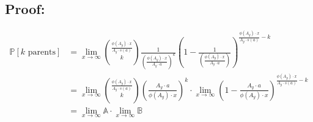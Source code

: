 \documentclass{article}
\theoremstyle{definition}
\begin{document}
\subsection*{Proof:}
\label{appendix:simple}
\begin{align*}
    \mathbb{P}[k \text{ parents}] & =  \lim_{x \to \infty}{\frac{\phi(A_y) \cdot x}{A_y \cdot s(a)} \choose k } \frac{1}{\left(\frac{\phi(A_y) \cdot x}{ A_y \cdot a}\right)^k} \left(1- \frac{1}{\left(\frac{\phi(A_y) \cdot x}{ A_y \cdot a}\right)}\right)^{\frac{\phi(A_y) \cdot x}{A_y \cdot s(a)  } -k} \\
                                  & =  \lim_{x \to \infty}{\frac{\phi(A_y) \cdot x}{A_y \cdot s(a)} \choose k } \left(\frac{A_y \cdot a}{\phi(A_y) \cdot x}\right)^k \cdot \lim_{x \to \infty}\left(1- \frac{A_y \cdot a}{\phi(A_y) \cdot x}\right)^{\frac{\phi(A_y) \cdot x}{A_y \cdot s(a)  } -k}           \\
                                  & =  \lim_{x \to \infty}\mathbb{A}  \cdot \lim_{x \to \infty} \mathbb{B}
\end{align*}
\end{document}
